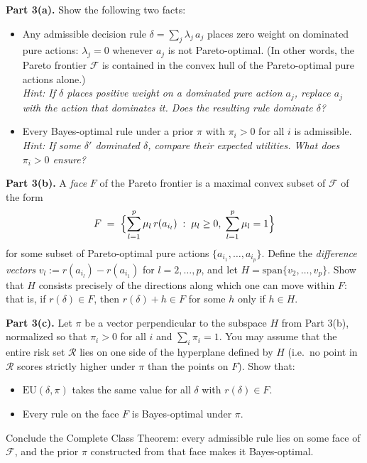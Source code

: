 \documentclass[11pt]{article}
\begin{document}
\begin{exercise}
\medskip
\noindent
\textbf{Part 3(a).} Show the following two facts:
\begin{itemize}
  \item[(i)] Any admissible decision rule $\delta = \sum_j \lambda_j\, a_j$ places
    zero weight on dominated pure actions: $\lambda_j = 0$ whenever $a_j$ is not
    Pareto-optimal. (In other words, the Pareto frontier $\mathcal{F}$ is contained
    in the convex hull of the Pareto-optimal pure actions alone.)\\
    \emph{Hint: If $\delta$ places positive weight on a dominated pure action $a_j$,
    replace $a_j$ with the action that dominates it. Does the resulting rule dominate
    $\delta$?}
  \item[(ii)] Every Bayes-optimal rule under a prior $\pi$ with $\pi_i > 0$ for all
    $i$ is admissible.\\
    \emph{Hint: If some $\delta'$ dominated $\delta$, compare their expected
    utilities. What does $\pi_i > 0$ ensure?}
\end{itemize}

\medskip
\noindent
\textbf{Part 3(b).} A \emph{face} $F$ of the Pareto frontier is a maximal convex
subset of $\mathcal{F}$ of the form
\[
  F \;=\; \Bigl\{\sum_{l=1}^p \mu_l\, r(a_{i_l}) \;:\;
  \mu_l \geq 0,\; \sum_{l=1}^p \mu_l = 1\Bigr\}
\]
for some subset of Pareto-optimal pure actions $\{a_{i_1}, \ldots, a_{i_p}\}$. Define
the \emph{difference vectors} $v_l := r(a_{i_l}) - r(a_{i_1})$ for
$l = 2, \ldots, p$, and let $H = \mathrm{span}\{v_2, \ldots, v_p\}$. Show that $H$
consists precisely of the directions along which one can move within $F$: that is, if
$r(\delta) \in F$, then $r(\delta) + h \in F$ for some $h$ only if $h \in H$.

\medskip
\noindent
\textbf{Part 3(c).} Let $\pi$ be a vector perpendicular to the subspace $H$ from
Part 3(b), normalized so that $\pi_i > 0$ for all $i$ and $\sum_i \pi_i = 1$. You may
assume that the entire risk set $\mathcal{R}$ lies on one side of the hyperplane
defined by $H$ (i.e.\ no point in $\mathcal{R}$ scores strictly higher under $\pi$
than the points on $F$). Show that:
\begin{itemize}
  \item[(i)] $\mathrm{EU}(\delta, \pi)$ takes the same value for all $\delta$ with
    $r(\delta) \in F$.
  \item[(ii)] Every rule on the face $F$ is Bayes-optimal under $\pi$.
\end{itemize}
Conclude the Complete Class Theorem: every admissible rule lies on some face of
$\mathcal{F}$, and the prior $\pi$ constructed from that face makes it Bayes-optimal.
\end{exercise}
\end{document}
